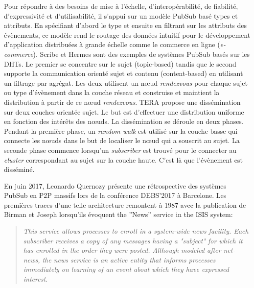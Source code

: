 Pour répondre à des besoins de mise à l'échelle, d'interopérabilité, de fiabilité, 
d'expressivité et d'utilisabilité, il s'appui sur un modèle \gls{PubSub} basé types et 
attributs. 
En spécifiant d'abord le type et ensuite en filtrant sur les attributs des 
évènements, ce modèle rend le routage des données intuitif pour le 
développement d'application distribuées à grande échelle comme le commerce en 
ligne (\textit{e-commerce}). 
Scribe \cite{Castro2002} et Hermes \cite{Pietzuch2002} sont des exemples de 
systèmes \gls{PubSub} basés sur les DHTs. 
Le premier se concentre sur le sujet (topic-based) tandis que le second 
supporte la communication orienté sujet et contenu (content-based) en utilisant un 
filtrage par agrégat. Les deux utilisent un n\oe ud \textit{rendezvous} pour chaque 
sujet ou type d'évènement dans la couche réseau et construise et maintient la 
distribution à partir de ce n\oe ud \textit{rendezvous}. TERA \cite{Baldoni2007} 
propose une dissémination sur deux couches orientée sujet. Le but est d'effectuer 
une distribution uniforme en fonction des intérêts des n\oe uds. La dissémination 
se déroule en deux phases. Pendant la première phase, un \textit{random walk} 
est utilisé sur la couche basse qui connecte les n\oe uds dans le but de localiser 
le n\oe ud qui a souscrit au sujet. La seconde phase commence lorsqu'un 
\textit{subscriber} est trouvé pour le connecter au \textit{cluster} correspondant au 
sujet sur la couche haute. C'est là que l'évènement est disséminé.

En juin 2017, Leonardo Quernozy présente une rétrospective des systèmes 
\gls{PubSub} en \gls{P2P} massifs lors de la conférence DEBS'2017 à 
Barcelone. 
Les premières traces d'une telle architecture remontent à 1987 avec 
la publication de Birman et Joseph \cite{Birman1987} lorsqu'ils évoquent \og 
the ''News'' service in the ISIS system\fg{}:

\blockcquote{Birman1987}{
	\og\textit{ This service allows processes to enroll in a 
		system-wide news facility. Each subscriber receives a
		copy of any messages having a "subject" for which it 
		has enrolled in the order they were posted. Although 
		modeled after net-news, the news service is an active 
		entity that informs processes immediately on learning 
		of an event about which they have expressed interest.}\fg{}
}

